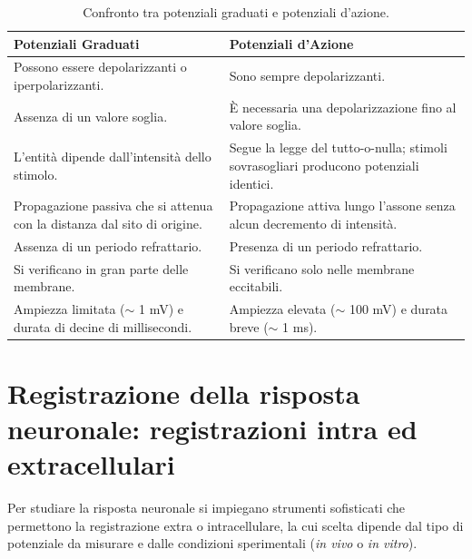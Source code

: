 \begin{table}[h!]
\centering
\small
\begin{tabularx}{\textwidth}{>{\raggedright\arraybackslash}X >{\raggedright\arraybackslash}X}
\toprule
\textbf{Potenziali Graduati} & \textbf{Potenziali d'Azione} \\
\midrule
Possono essere depolarizzanti o iperpolarizzanti. & Sono sempre depolarizzanti. \\\midrule
Assenza di un valore soglia. & È necessaria una depolarizzazione fino al valore soglia. \\\midrule
L'entità dipende dall'intensità dello stimolo. & Segue la legge del tutto-o-nulla; stimoli sovrasogliari producono potenziali identici. \\\midrule
Propagazione passiva che si attenua con la distanza dal sito di origine. & Propagazione attiva lungo l'assone senza alcun decremento di intensità. \\\midrule
Assenza di un periodo refrattario. & Presenza di un periodo refrattario. \\\midrule
Si verificano in gran parte delle membrane. & Si verificano solo nelle membrane eccitabili. \\\midrule
Ampiezza limitata ($\sim$ 1 mV) e durata di decine di millisecondi. & Ampiezza elevata ($\sim$ 100 mV) e durata breve ($\sim$ 1 ms). \\
\bottomrule
\end{tabularx}
\caption{Confronto tra potenziali graduati e potenziali d'azione.}
\end{table}

\newpage
\section{Registrazione della risposta neuronale: registrazioni intra ed extracellulari}

Per studiare la risposta neuronale si impiegano strumenti sofisticati che permettono la registrazione extra o intracellulare, la cui scelta dipende dal tipo di potenziale da misurare e dalle condizioni sperimentali (\textit{in vivo} o \textit{in vitro}).


